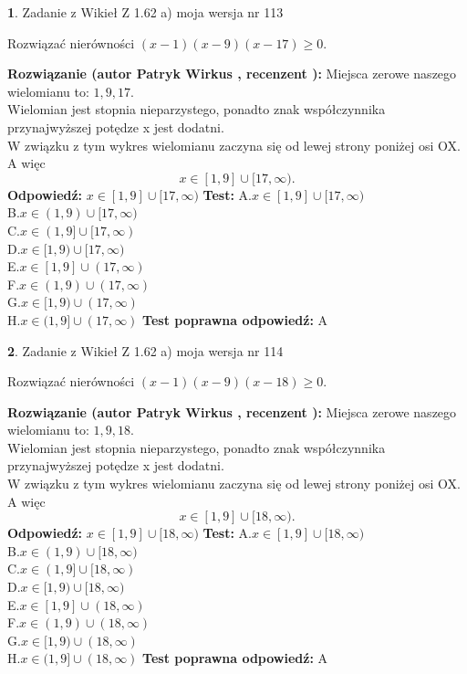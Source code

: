 \documentclass[12pt, a4paper]{article}
\theoremstyle{definition} %
\newtheorem{zad}{}
\newcommand{\zadStart}[1]{\begin{zad}#1\newline}
\newcommand{\zadStop}{\end{zad}}
\newcommand{\rozwStart}[2]{\noindent \textbf{Rozwiązanie (autor #1 , recenzent #2): }\newline}
\newcommand{\rozwStop}{\newline}
\newcommand{\odpStart}{\noindent \textbf{Odpowiedź:}\newline}
\newcommand{\odpStop}{\newline}
\newcommand{\testStart}{\noindent \textbf{Test:}\newline}
\newcommand{\testStop}{\newline}
\newcommand{\kluczStart}{\noindent \textbf{Test poprawna odpowiedź:}\newline}
\newcommand{\kluczStop}{\newline}
\begin{document}
\zadStart{Zadanie z Wikieł Z 1.62 a) moja wersja nr 113}

Rozwiązać nierówności $(x-1)(x-9)(x-17)\ge0$.
\zadStop
\rozwStart{Patryk Wirkus}{}
Miejsca zerowe naszego wielomianu to: $1, 9, 17$.\\
Wielomian jest stopnia nieparzystego, ponadto znak współczynnika przy\linebreak najwyższej potędze x jest dodatni.\\ W związku z tym wykres wielomianu zaczyna się od lewej strony poniżej osi OX. A więc $$x \in [1,9] \cup [17,\infty).$$
\rozwStop
\odpStart
$x \in [1,9] \cup [17,\infty)$
\odpStop
\testStart
A.$x \in [1,9] \cup [17,\infty)$\\
B.$x \in (1,9) \cup [17,\infty)$\\
C.$x \in (1,9] \cup [17,\infty)$\\
D.$x \in [1,9) \cup [17,\infty)$\\
E.$x \in [1,9] \cup (17,\infty)$\\
F.$x \in (1,9) \cup (17,\infty)$\\
G.$x \in [1,9) \cup (17,\infty)$\\
H.$x \in (1,9] \cup (17,\infty)$
\testStop
\kluczStart
A
\kluczStop



\zadStart{Zadanie z Wikieł Z 1.62 a) moja wersja nr 114}

Rozwiązać nierówności $(x-1)(x-9)(x-18)\ge0$.
\zadStop
\rozwStart{Patryk Wirkus}{}
Miejsca zerowe naszego wielomianu to: $1, 9, 18$.\\
Wielomian jest stopnia nieparzystego, ponadto znak współczynnika przy\linebreak najwyższej potędze x jest dodatni.\\ W związku z tym wykres wielomianu zaczyna się od lewej strony poniżej osi OX. A więc $$x \in [1,9] \cup [18,\infty).$$
\rozwStop
\odpStart
$x \in [1,9] \cup [18,\infty)$
\odpStop
\testStart
A.$x \in [1,9] \cup [18,\infty)$\\
B.$x \in (1,9) \cup [18,\infty)$\\
C.$x \in (1,9] \cup [18,\infty)$\\
D.$x \in [1,9) \cup [18,\infty)$\\
E.$x \in [1,9] \cup (18,\infty)$\\
F.$x \in (1,9) \cup (18,\infty)$\\
G.$x \in [1,9) \cup (18,\infty)$\\
H.$x \in (1,9] \cup (18,\infty)$
\testStop
\kluczStart
A
\kluczStop
\end{document}
